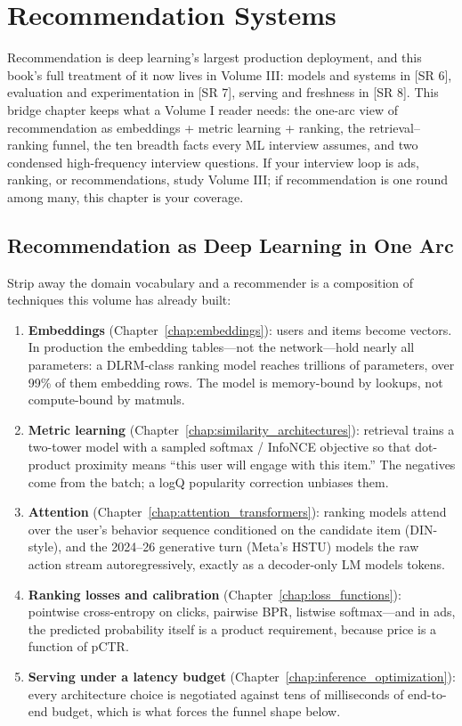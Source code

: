 \chapter{Recommendation Systems}
\label{chap:recommendation}
\label{chap:recommendation_systems}

\begin{tldr}
Recommendation is deep learning's largest production deployment, and this book's full treatment of it now lives in Volume III: models and systems in [SR 6], evaluation and experimentation in [SR 7], serving and freshness in [SR 8]. This bridge chapter keeps what a Volume I reader needs: the one-arc view of recommendation as embeddings + metric learning + ranking, the retrieval--ranking funnel, the ten breadth facts every ML interview assumes, and two condensed high-frequency interview questions. If your interview loop is ads, ranking, or recommendations, study Volume III; if recommendation is one round among many, this chapter is your coverage.
\end{tldr}

\section{Recommendation as Deep Learning in One Arc}
\label{sec:recsys_bridge_arc}

Strip away the domain vocabulary and a recommender is a composition of techniques this volume has already built:

\begin{enumerate}
    \item \textbf{Embeddings} (Chapter~\ref{chap:embeddings}): users and items become vectors. In production the embedding tables---not the network---hold nearly all parameters: a DLRM-class ranking model reaches trillions of parameters, over 99\% of them embedding rows. The model is memory-bound by lookups, not compute-bound by matmuls.
    \item \textbf{Metric learning} (Chapter~\ref{chap:similarity_architectures}): retrieval trains a two-tower model with a sampled softmax / InfoNCE objective so that dot-product proximity means ``this user will engage with this item.'' The negatives come from the batch; a logQ popularity correction unbiases them.
    \item \textbf{Attention} (Chapter~\ref{chap:attention_transformers}): ranking models attend over the user's behavior sequence conditioned on the candidate item (DIN-style), and the 2024--26 generative turn (Meta's HSTU) models the raw action stream autoregressively, exactly as a decoder-only LM models tokens.
    \item \textbf{Ranking losses and calibration} (Chapter~\ref{chap:loss_functions}): pointwise cross-entropy on clicks, pairwise BPR, listwise softmax---and in ads, the predicted probability itself is a product requirement, because price is a function of pCTR.
    \item \textbf{Serving under a latency budget} (Chapter~\ref{chap:inference_optimization}): every architecture choice is negotiated against tens of milliseconds of end-to-end budget, which is what forces the funnel shape below.
\end{enumerate}

